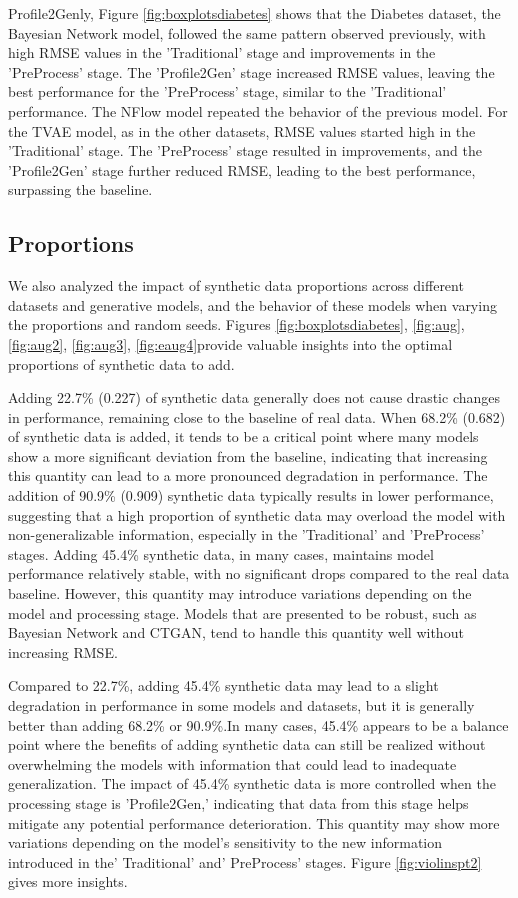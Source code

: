 \documentclass{article}
\theoremstyle{plain}
\theoremstyle{definition}
\theoremstyle{remark}
\begin{document}
Profile2Genly, Figure \ref{fig:boxplotsdiabetes} shows that the Diabetes dataset, the Bayesian Network model, followed the same pattern observed previously, with high RMSE values in the 'Traditional' stage and improvements in the 'PreProcess' stage. The 'Profile2Gen' stage increased RMSE values, leaving the best performance for the 'PreProcess' stage, similar to the 'Traditional' performance. The NFlow model repeated the behavior of the previous model. For the TVAE model, as in the other datasets, RMSE values started high in the 'Traditional' stage. The 'PreProcess' stage resulted in improvements, and the 'Profile2Gen' stage further reduced RMSE, leading to the best performance, surpassing the baseline.



\subsection{Proportions}

We also analyzed the impact of synthetic data proportions across different datasets and generative models, and the behavior of these models when varying the proportions and random seeds. Figures \ref{fig:boxplotsdiabetes}, \ref{fig:aug}, \ref{fig:aug2}, \ref{fig:aug3}, \ref{fig:eaug4}provide valuable insights into the optimal proportions of synthetic data to add. 

Adding 22.7\% (0.227) of synthetic data generally does not cause drastic changes in performance, remaining close to the baseline of real data. When 68.2\% (0.682) of synthetic data is added, it tends to be a critical point where many models show a more significant deviation from the baseline, indicating that increasing this quantity can lead to a more pronounced degradation in performance. The addition of 90.9\% (0.909) synthetic data typically results in lower performance, suggesting that a high proportion of synthetic data may overload the model with non-generalizable information, especially in the 'Traditional' and 'PreProcess' stages. Adding 45.4\% synthetic data, in many cases, maintains model performance relatively stable, with no significant drops compared to the real data baseline. However, this quantity may introduce variations depending on the model and processing stage. Models that are presented to be robust, such as Bayesian Network and CTGAN, tend to handle this quantity well without increasing RMSE.

Compared to 22.7\%, adding 45.4\% synthetic data may lead to a slight degradation in performance in some models and datasets, but it is generally better than adding 68.2\% or 90.9\%.In many cases, 45.4\% appears to be a balance point where the benefits of adding synthetic data can still be realized without overwhelming the models with information that could lead to inadequate generalization. The impact of 45.4\% synthetic data is more controlled when the processing stage is 'Profile2Gen,' indicating that data from this stage helps mitigate any potential performance deterioration. This quantity may show more variations depending on the model's sensitivity to the new information introduced in the' Traditional' and' PreProcess' stages. Figure \ref{fig:violinspt2} gives more insights.
\end{document}
